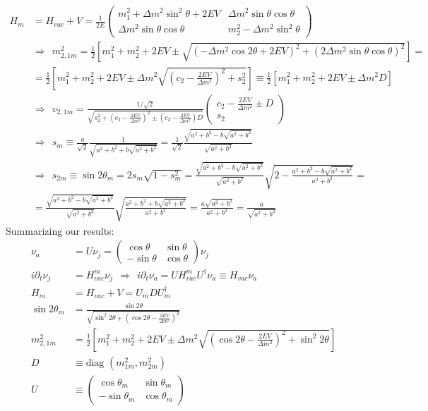 \documentclass[a4paper,12pt]{article}
\begin{document}
\begin{align*}
H_m&=H_{vac}+V=\frac{1}{2E}\begin{pmatrix}
m_1^2+\Delta m^2\sin^2\theta +2EV&\Delta m^2\sin\theta\cos\theta\\ \Delta m^2\sin\theta\cos\theta &m_2^2-\Delta m^2\sin^2\theta
\end{pmatrix}\\
&\Rightarrow\ \ m_{2,1m}^2=\frac{1}{2}\left[m_1^2+m_2^2+2EV\pm\sqrt{(-\Delta m^2\cos 2\theta+2EV)^2+(2\Delta m^2\sin\theta\cos\theta)^2}\right]=\\
&=\frac{1}{2}\left[m_1^2+m_2^2+2EV\pm\Delta m^2\sqrt{(c_2-\frac{2EV}{\Delta m^2})^2+s_2^2}\right]\equiv \frac{1}{2}[m_1^2+m_2^2+2EV\pm \Delta m^2 D]\\
&\Rightarrow\ \ v_{2,1m}=\frac{1/\sqrt{2}}{\sqrt{s_2^2+(c_2-\frac{2EV}{\Delta m^2})^2\pm (c_2-\frac{2EV}{\Delta m^2})D}}\begin{pmatrix}
c_2-\frac{2EV}{\Delta m^2}\pm D\\ s_2
\end{pmatrix}\\
&\Rightarrow\ \ s_m\equiv\frac{a}{\sqrt{2}}\frac{1}{\sqrt{a^2+b^2+b\sqrt{a^2+b^2}}}=\frac{1}{\sqrt{2}}\frac{\sqrt{a^2+b^2 -b\sqrt{a^2+b^2}}}{\sqrt{a^2+b^2}} \\
&\Rightarrow\ \ s_{2m}\equiv\sin 2\theta_m=2s_m\sqrt{1-s_m^2}=\frac{\sqrt{a^2+b^2 -b\sqrt{a^2+b^2}}}{\sqrt{a^2+b^2}}\sqrt{2-\frac{a^2+b^2 -b\sqrt{a^2+b^2}}{a^2+b^2}}=\\
&=\frac{\sqrt{a^2+b^2 -b\sqrt{a^2+b^2}}}{\sqrt{a^2+b^2}}\sqrt{\frac{a^2+b^2+b\sqrt{a^2+b^2}}{a^2+b^2}}=\frac{a\sqrt{a^2+b^2}}{a^2+b^2}=\frac{a}{\sqrt{a^2+b^2}}
\end{align*}
Summarizing our results:
\begin{align*}
\nu_a&=U\nu_j=\begin{pmatrix}
\cos\theta &\sin\theta \\ -\sin\theta & \cos\theta 
\end{pmatrix}\nu_j\\
i\partial_t \nu_j&=H_{vac}^m\nu_j\ \ \Rightarrow\ \ i\partial_t\nu_a=UH_{vac}^mU^\dagger\nu_a\equiv H_{vac}\nu_a\\
H_m&=H_{vac}+V=U_m DU_m^\dagger\\
\sin 2\theta_m &=\frac{\sin 2\theta}{\sqrt{\sin^2 2\theta +(\cos 2\theta -\frac{2EV}{\Delta m^2})^2}}\\
m_{2,1m}^2&=\frac{1}{2}\left[m_1^2+m_2^2+2EV\pm\Delta m^2\sqrt{(\cos 2\theta-\frac{2EV}{\Delta m^2})^2+\sin^2 2\theta}\right]\\
D&\equiv \textrm{diag }(m_{1m}^2, m_{2m}^2)\\
U&\equiv \begin{pmatrix}
\cos\theta_m &\sin\theta_m \\
-\sin\theta_m &\cos\theta_m
\end{pmatrix}
\end{align*}
\end{document}
